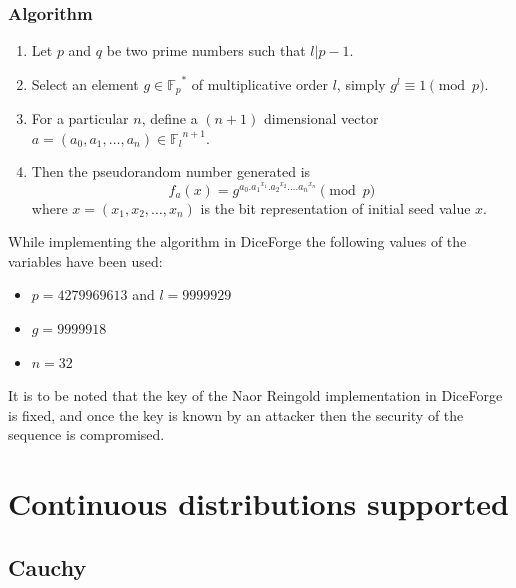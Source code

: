 \documentclass[titlepage, 11pt]{article}
\begin{document}
\subsubsection{Algorithm}
\begin{enumerate}
\item Let $p$ and $q$ be two prime numbers such that $l | p-1$.
\item Select an element $g \in {\displaystyle {\mathbb {F} _{p}}^{*}}$ of multiplicative order $l$, simply $g^l \equiv 1 \pmod{p}$.
\item For a particular $n$, define a $(n+1)$ dimensional vector $a = (a_{0}, a_{1}, \dots, a_{n}) \in {\displaystyle {\mathbb {F}_{l}}^{n+1}}$.
\item Then the pseudorandom number generated is 
\begin{equation}
f_{a}(x) = g^{a_{0}.{a_{1}}^{x_{1}}.{a_{2}}^{x_{2}}\dots.{a_{n}}^{x_{n}}} \pmod{p}
\end{equation}
where $x = (x_{1}, x_{2}, \dots, x_{n})$ is the bit representation of initial seed value $x$.
\end{enumerate}

While implementing the algorithm in DiceForge the following values of the variables have been used:
\begin{itemize}
    \item $p=4279969613$ and $l=9999929$
    \item $g=9999918$
    \item $n=32$
\end{itemize}
It is to be noted that the key of the Naor Reingold implementation in DiceForge is fixed, and once the key is known by an attacker then the security of the sequence is compromised.
    


\newpage
\section {Continuous distributions supported}
\label{sec:6}

\subsection{Cauchy}
\end{document}
